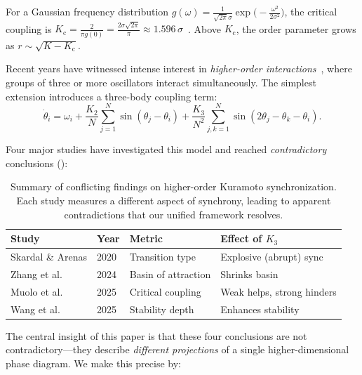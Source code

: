 \documentclass{article}
\newcommand{\Kc}{K_{\mathrm{c}}}
\begin{document}
For a Gaussian frequency distribution $g(\omega)=\frac{1}{\sqrt{2\pi}\sigma}
\exp\!\bigl(-\frac{\omega^2}{2\sigma^2}\bigr)$, the critical coupling is
$\Kc = \frac{2}{\pi g(0)} = \frac{2\sigma\sqrt{2\pi}}{\pi}
\approx 1.596\,\sigma$~\citep{Kuramoto1984}.  Above
$\Kc$, the order parameter grows as $r\sim\sqrt{K-\Kc}$.

Recent years have witnessed intense interest in \emph{higher-order
interactions}~\citep{Skardal2020,Zhang2024,Muolo2025,Wang2025}, where groups of
three or more oscillators interact simultaneously.  The simplest extension
introduces a three-body coupling term:
\begin{equation}
  \dot{\theta}_i = \omega_i
  + \frac{K_2}{N}\sum_{j=1}^{N}\sin(\theta_j - \theta_i)
  + \frac{K_3}{N^2}\sum_{j,k=1}^{N}\sin(2\theta_j - \theta_k - \theta_i).
  \label{eq:higher-order-kuramoto}
\end{equation}

Four major studies have investigated this model and reached \emph{contradictory}
conclusions ():

\begin{table}[t]
  \caption{Summary of conflicting findings on higher-order Kuramoto
    synchronization.  Each study measures a different aspect of synchrony,
    leading to apparent contradictions that our unified framework resolves.}
  \label{tab:literature}
  \centering
  \begin{tabular}{llll}
    \toprule
    \textbf{Study} & \textbf{Year} & \textbf{Metric} & \textbf{Effect of $K_3$} \\
    \midrule
    Skardal \& Arenas & 2020 & Transition type & Explosive (abrupt) sync \\
    Zhang et al. & 2024 & Basin of attraction & Shrinks basin \\
    Muolo et al. & 2025 & Critical coupling & Weak helps, strong hinders \\
    Wang et al. & 2025 & Stability depth & Enhances stability \\
    \bottomrule
  \end{tabular}
\end{table}

The central insight of this paper is that these four conclusions are not
contradictory---they describe \emph{different projections} of a single
higher-dimensional phase diagram.  We make this precise by:
\end{document}
